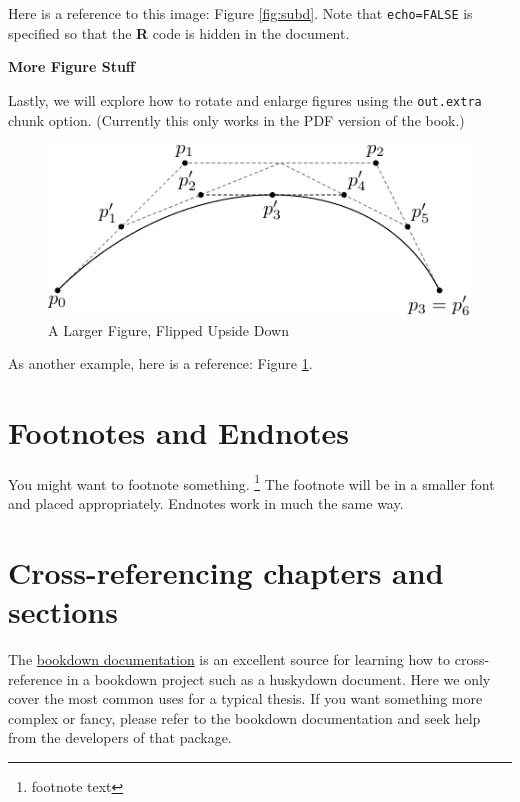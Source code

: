 \documentclass[print]{nuthesis}
\begin{document}
Here is a reference to this image: Figure \ref{fig:subd}. Note that \texttt{echo=FALSE} is specified so that the \textbf{R} code is hidden in the document.

\textbf{More Figure Stuff}

Lastly, we will explore how to rotate and enlarge figures using the \texttt{out.extra} chunk option. (Currently this only works in the PDF version of the book.)

\begin{figure}
\includegraphics[width=\linewidth,angle=180, scale=1.1]{figure/subdivision} \caption{A Larger Figure, Flipped Upside Down}\label{fig:subd2}
\end{figure}

As another example, here is a reference: Figure \ref{fig:subd2}.

\hypertarget{footnotes-and-endnotes}{%
\section{Footnotes and Endnotes}\label{footnotes-and-endnotes}}

You might want to footnote something. \footnote{footnote text} The footnote will be in a smaller font and placed appropriately. Endnotes work in much the same way.

\hypertarget{cross-referencing-chapters-and-sections}{%
\section{Cross-referencing chapters and sections}\label{cross-referencing-chapters-and-sections}}

The \href{https://bookdown.org/yihui/bookdown/cross-references.html}{bookdown documentation} is an excellent source for learning how to cross-reference in a bookdown project such as a huskydown document. Here we only cover the most common uses for a typical thesis. If you want something more complex or fancy, please refer to the bookdown documentation and seek help from the developers of that package.
\end{document}
